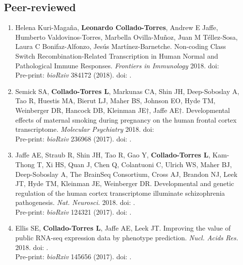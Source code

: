 \subsection{Peer-reviewed}
    \begin{enumerate}
        \item Helena Kuri-Magaña, \textbf{Leonardo Collado-Torres}, Andrew E Jaffe, Humberto Valdovinos-Torres, Marbella Ovilla-Muñoz, Juan M Téllez-Sosa, Laura C Bonifaz-Alfonzo, Jesús Martínez-Barnetche. Non-coding Class Switch Recombination-Related Transcription in Human Normal and Pathological Immune Responses. \emph{Frontiers in Immunology} 2018. doi: 
        \\ Pre-print: \emph{bioRxiv} 384172 (2018). doi: .
        
        \item Semick SA, \textbf{Collado-Torres L}, Markunas CA, Shin JH, Deep-Soboslay A, Tao R, Huestis MA, Bierut LJ, Maher BS, Johnson EO, Hyde TM, Weinberger DR, Hancock DB, Kleinman JE$\dagger$, Jaffe AE$\dagger$. Developmental effects of maternal smoking during pregnancy on the human frontal cortex transcriptome. \emph{Molecular Psychiatry} 2018. doi: 
        \\ Pre-print: \emph{bioRxiv} 236968 (2017). doi: .
        
        \item Jaffe AE, Straub R, Shin JH, Tao R, Gao Y, \textbf{Collado-Torres L}, Kam-Thong T, Xi HS, Quan J, Chen Q, Colantuoni C, Ulrich WS, Maher BJ, Deep-Soboslay A, The BrainSeq Consortium, Cross AJ, Brandon NJ, Leek JT, Hyde TM, Kleinman JE, Weinberger DR. Developmental and genetic regulation of the human cortex transcriptome illuminate schizophrenia pathogenesis. \emph{Nat. Neurosci.} 2018. doi: .
        \\ Pre-print: \emph{bioRxiv} 124321 (2017). doi: .
        
        \item Ellis SE, \textbf{Collado-Torres L}, Jaffe AE, Leek JT. Improving the value of public RNA-seq expression data by phenotype prediction. \emph{Nucl. Acids Res.} 2018. doi: .
        \\ Pre-print: \emph{bioRxiv} 145656 (2017). doi: .
        

\end{enumerate}
